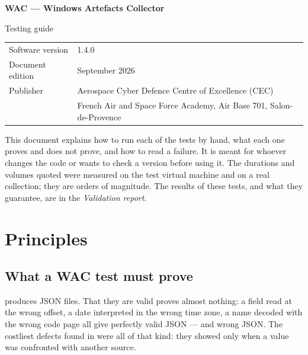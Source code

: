 \documentclass[11pt,a4paper,oneside]{report}
\begin{document}

\thispagestyle{empty}
\vspace*{\fill}
{\color{marine}\Large\bfseries WAC — Windows Artefacts Collector}\par
{\color{bleu}Testing guide}\par
\medskip
\begin{tabular}{@{}ll@{}}
Software version & 1.4.0 \\
Document edition & September 2026 \\
Publisher & Aerospace Cyber Defence Centre of Excellence (CEC) \\
          & French Air and Space Force Academy, Air Base 701, Salon-de-Provence \\
\end{tabular}

\bigskip
{\small\color{gris}This document explains how to run each of the \wac{} tests
by hand, what each one proves and does not prove, and how to read a failure. It
is meant for whoever changes the code or wants to check a version before using
it. The durations and volumes quoted were measured on the test virtual machine
and on a real collection; they are orders of magnitude. The results of these
tests, and what they guarantee, are in the \emph{Validation report}.}
\vspace*{2cm}
\clearpage

\tableofcontents

\chapter{Principles}

\section{What a WAC test must prove}

\wac{} produces JSON files. That they are valid proves almost nothing: a field
read at the wrong offset, a date interpreted in the wrong time zone, a name
decoded with the wrong code page all give perfectly valid JSON — and wrong
JSON. The costliest defects found in \wac{} were all of that kind: they showed
only when a value was confronted with another source.
\end{document}
